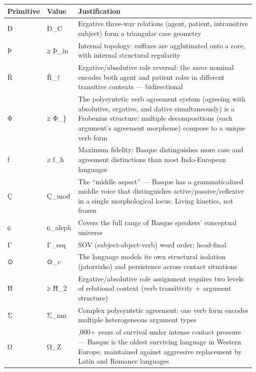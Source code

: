 \documentclass[
  11pt,
  a4paper,
]{article}
\newcounter{none} %
\begin{document}
{\def\LTcaptype{none} %
\begin{longtable}[]{@{}
  >{\raggedright\arraybackslash}p{}
  >{\raggedright\arraybackslash}p{}
  >{\raggedright\arraybackslash}p{}@{}}
\toprule\noalign{}
\begin{minipage}[b]{\linewidth}\raggedright
Primitive
\end{minipage} & \begin{minipage}[b]{\linewidth}\raggedright
Value
\end{minipage} & \begin{minipage}[b]{\linewidth}\raggedright
Justification
\end{minipage} \\
\midrule\noalign{}
\endhead
\bottomrule\noalign{}
\endlastfoot
Ð & Ð\_C & Ergative three-way relations (agent, patient, intransitive
subject) form a triangular case geometry \\
Þ & ≥ Þ\_in & Internal topology: suffixes are agglutinated onto a core,
with internal structural regularity \\
Ř & Ř\_† & Ergative/absolutive role reversal: the \emph{same} nominal
encodes both agent and patient roles in different transitive contexts
--- bidirectional \\
Φ & ≥ Φ\_\} & The polysyntetic verb agreement system (agreeing with
absolutive, ergative, and dative simultaneously) is a Frobenius
structure: multiple decompositions (each argument's agreement morpheme)
compose to a unique verb form \\
ƒ & ≥ ƒ\_ħ & Maximum fidelity: Basque distinguishes more case and
agreement distinctions than most Indo-European languages \\
Ç & Ç\_mod & The ``middle aspect'' --- Basque has a grammaticalized
middle voice that distinguishes active/passive/reflexive in a single
morphological locus. Living kinetics, not frozen \\
ɢ & ɢ\_aleph & Covers the full range of Basque speakers' conceptual
universe \\
Γ & Γ\_seq & SOV (subject-object-verb) word order; head-final \\
⊙ & ⊙\_c & The language models its own structural isolation (jatorrizko)
and persistence across contact situations \\
Ħ & ≥ Ħ\_2 & Ergative/absolutive role assignment requires two levels of
relational context (verb transitivity + argument structure) \\
Σ & Σ\_nm & Complex polysyntetic agreement: one verb form encodes
multiple heterogeneous argument types \\
Ω & Ω\_Z & 2,000+ years of survival under intense contact pressure ---
Basque is the oldest surviving language in Western Europe, maintained
against aggressive replacement by Latin and Romance languages \\
\end{longtable}
}
\end{document}
